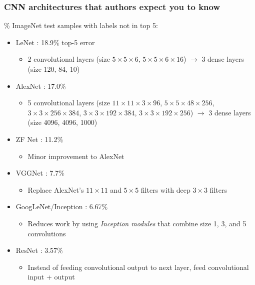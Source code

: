 \begin{frame}
    \frametitle{CNN architectures that authors expect you to know}

    \% ImageNet test samples with labels not in top 5:
    \begin{itemize}
        \item<+-> LeNet \citep{LeCunIEEE98}: 18.9\% top-5 error
        \begin{itemize}
            \item 2 convolutional layers (size $5 \times 5 \times 6$, $5 \times 5 \times 6 \times 16$) $\to$ 3 dense layers (size 120, 84, 10)
        \end{itemize}
        \item<+-> AlexNet \citep{KrizhevskyNIPS12}: 17.0\%
        \begin{itemize}
            \item 5 convolutional layers (size $11 \times 11 \times 3 \times 96$, $5 \times 5 \times 48 \times 256$, $3 \times 3 \times 256 \times 384$, $3 \times 3 \times 192 \times 384$, $3 \times 3 \times 192 \times 256$) $\to$ 3 dense layers (size 4096, 4096, 1000)
        \end{itemize}
        \item<+-> ZF Net \citep{ZeilerECCV14}: 11.2\%
        \begin{itemize}
            \item Minor improvement to AlexNet
        \end{itemize}
        \item<+-> VGGNet \citep{Simonyan14}: 7.7\%
        \begin{itemize}
            \item Replace AlexNet's $11 \times 11$ and $5 \times 5$ filters with deep $3 \times 3$ filters
        \end{itemize}
        \item<+-> GoogLeNet/Inception \citep{SzegedyIEEECVPR15}: 6.67\%
        \begin{itemize}
            \item Reduces work by using \emph{Inception modules} that combine size 1, 3, and 5 convolutions
        \end{itemize}
        \item<+-> ResNet \citep{He15b}: 3.57\%
        \begin{itemize}
            \item Instead of feeding convolutional output to next layer, feed convolutional input + output
        \end{itemize}
    \end{itemize}
\end{frame}

